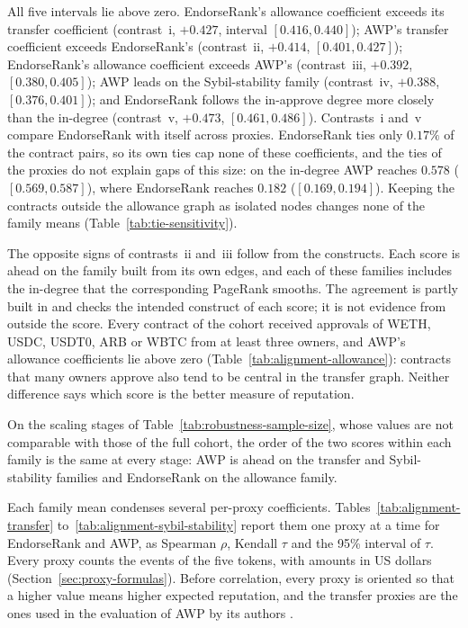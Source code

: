

All five intervals lie above zero. EndorseRank's allowance coefficient exceeds its transfer coefficient (contrast~i, $+0.427$, interval $[0.416,0.440]$); AWP's transfer coefficient exceeds EndorseRank's (contrast~ii, $+0.414$, $[0.401,0.427]$); EndorseRank's allowance coefficient exceeds AWP's (contrast~iii, $+0.392$, $[0.380,0.405]$); AWP leads on the Sybil-stability family (contrast~iv, $+0.388$, $[0.376,0.401]$); and EndorseRank follows the in-approve degree more closely than the in-degree (contrast~v, $+0.473$, $[0.461,0.486]$). Contrasts~i and~v compare EndorseRank with itself across proxies. EndorseRank ties only $0.17\%$ of the contract pairs, so its own ties cap none of these coefficients, and the ties of the proxies do not explain gaps of this size: on the in-degree AWP reaches $0.578$ ($[0.569,0.587]$), where EndorseRank reaches $0.182$ ($[0.169,0.194]$). Keeping the contracts outside the allowance graph as isolated nodes changes none of the family means (Table~\ref{tab:tie-sensitivity}).

The opposite signs of contrasts~ii and~iii follow from the constructs. Each score is ahead on the family built from its own edges, and each of these families includes the in-degree that the corresponding PageRank smooths. The agreement is partly built in and checks the intended construct of each score; it is not evidence from outside the score. Every contract of the cohort received approvals of WETH, USDC, USDT0, ARB or WBTC from at least three owners, and AWP's allowance coefficients lie above zero (Table~\ref{tab:alignment-allowance}): contracts that many owners approve also tend to be central in the transfer graph. Neither difference says which score is the better measure of reputation.

On the scaling stages of Table~\ref{tab:robustness-sample-size}, whose values are not comparable with those of the full cohort, the order of the two scores within each family is the same at every stage: AWP is ahead on the transfer and Sybil-stability families and EndorseRank on the allowance family.


Each family mean condenses several per-proxy coefficients. Tables~\ref{tab:alignment-transfer} to~\ref{tab:alignment-sybil-stability} report them one proxy at a time for EndorseRank and AWP, as Spearman $\rho$, Kendall $\tau$ and the 95\% interval of $\tau$. Every proxy counts the events of the five tokens, with amounts in US dollars (Section~\ref{sec:proxy-formulas}). Before correlation, every proxy is oriented so that a higher value means higher expected reputation, and the transfer proxies are the ones used in the evaluation of AWP by its authors \parencite{do2023awp}.

